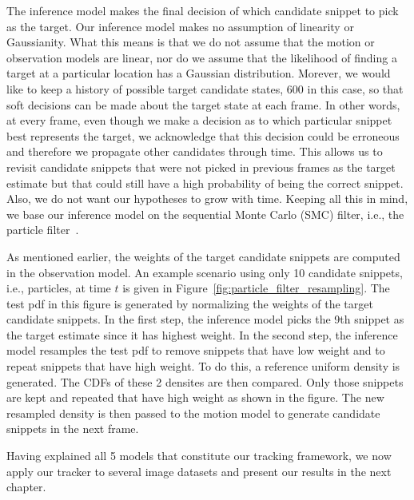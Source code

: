 The inference model makes the final decision of which candidate snippet to pick as the target.  Our inference model makes no assumption of linearity or Gaussianity.  What this means is that we do not assume that the motion or observation models are linear, nor do we assume that the likelihood of finding a target at a particular location has a Gaussian distribution.  Morever, we would like to keep a history of possible target candidate states, 600 in this case, so that soft decisions can be made about the target state at each frame.  In other words, at every frame, even though we make a decision as to which particular snippet best represents the target, we acknowledge that this decision could be erroneous and therefore we propagate other candidates through time.  This allows us to revisit candidate snippets that were not picked in previous frames as the target estimate but that could still have a high probability of being the correct snippet.  Also, we do not want our hypotheses to grow with time.  Keeping all this in mind, we base our inference model on the sequential Monte Carlo (SMC) filter, i.e., the particle filter~\cite{2002_JNL_PF_Arulampalam}.  

As mentioned earlier, the weights of the target candidate snippets are computed in the observation model.  An example scenario using only 10 candidate snippets, i.e., particles, at time $t$ is given in Figure~\ref{fig:particle_filter_resampling}.  The test pdf in this figure is generated by normalizing the weights of the target candidate snippets.  In the first step, the inference model picks the 9th snippet as the target estimate since it has highest weight.  In the second step, the inference model resamples the test pdf to remove snippets that have low weight and to repeat snippets that have high weight.  To do this, a reference uniform density is generated.  The CDFs of these 2 densites are then compared.  Only those snippets are kept and repeated that have high weight as shown in the figure.  The new resampled density is then passed to the motion model to generate candidate snippets in the next frame.

Having explained all 5 models that constitute our tracking framework, we now apply our tracker to several image datasets and present our results in the next chapter.




%
%








